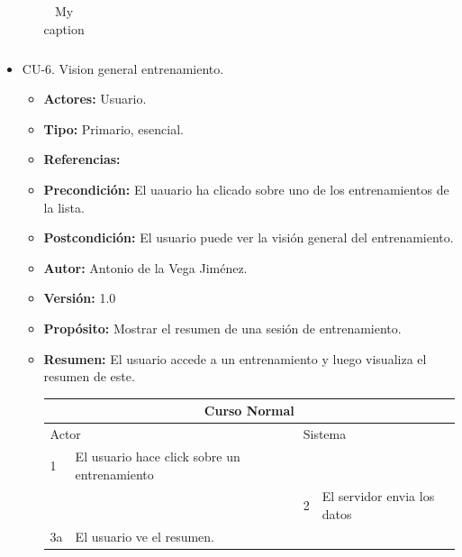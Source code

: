 \begin{itemize}
\begin{itemize}
\begin{table}[H]
\begin{tabularx}{\textwidth}{|l|X|l|X|}
      \end{tabularx}
      \caption{My caption}
      \label{my-label}
    \end{table}
  \end{itemize}
  \item CU-6. Vision general entrenamiento.
  \begin{itemize}
    \item \textbf{Actores:} Usuario.
    \item \textbf{Tipo:} Primario, esencial.
    \item \textbf{Referencias:}
    \item \textbf{Precondición:} El uauario ha clicado sobre uno de los entrenamientos de la lista.
    \item \textbf{Postcondición:} El usuario puede ver la visión general del entrenamiento.
    \item \textbf{Autor:} Antonio de la Vega Jiménez.
    \item \textbf{Versión:} 1.0
    \item \textbf{Propósito:} Mostrar el resumen de una sesión de entrenamiento.
    \item \textbf{Resumen:} El usuario accede a un entrenamiento y luego visualiza el resumen de este.
    \begin{table}[H]
      \centering
      \begin{tabularx}{\textwidth}{|l|X|l|X|}
        \hline
        \multicolumn{4}{|c|}{\cellcolor[HTML]{C0C0C0}Curso Normal}                                                 \\ \hline
        \multicolumn{2}{|l|}{\cellcolor[HTML]{EFEFEF}Actor} & \multicolumn{2}{l|}{\cellcolor[HTML]{EFEFEF}Sistema} \\ \hline
        1                         & El usuario hace click sobre un entrenamiento                       &                            &                         \\ \hline
                                  &                         & 2                          & El servidor envia los datos                     \\ \hline
        3a                         & El usuario ve el resumen.      &                          &                        \\ \hline
                                  

\end{tabularx}
\end{table}
\end{itemize}
\end{itemize}

